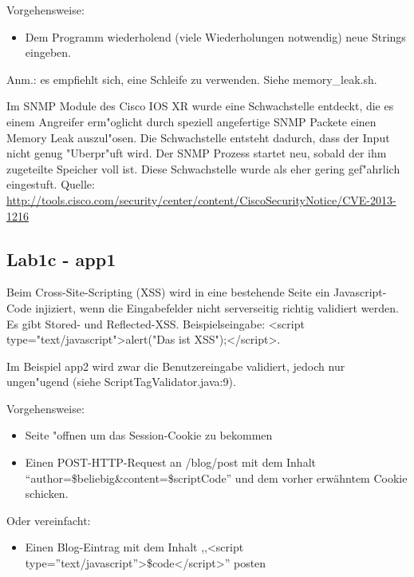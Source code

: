 \documentclass[12pt,a4paper,titlepage,oneside]{scrartcl}
\begin{document}
\begin{description}
Vorgehensweise:
\begin{itemize}
	\item Dem Programm wiederholend (viele Wiederholungen notwendig) neue Strings eingeben.
\end{itemize}
Anm.: es empfiehlt sich, eine Schleife zu verwenden. Siehe memory\_leak.sh.\newline
    
    Im SNMP Module des Cisco IOS XR wurde eine Schwachstelle entdeckt, die es einem Angreifer erm"oglicht durch speziell angefertige SNMP Packete einen Memory Leak auszul"osen. Die Schwachstelle entsteht dadurch, dass der Input nicht genug "Uberpr"uft wird. Der SNMP Prozess startet neu, sobald der ihm zugeteilte Speicher voll ist. Diese Schwachstelle wurde als eher gering gef"ahrlich eingestuft.\newline
    Quelle: \url{http://tools.cisco.com/security/center/content/CiscoSecurityNotice/CVE-2013-1216}
\end{description}

\subsection{Lab1c - app1}
Beim Cross-Site-Scripting (XSS) wird in eine bestehende Seite ein Javascript-Code injiziert, wenn die Eingabefelder nicht serverseitig richtig validiert werden.\newline
Es gibt Stored- und Reflected-XSS.\newline
Beispielseingabe: <script type="text/javascript">alert("Das ist XSS");</script>.\newline

Im Beispiel app2 wird zwar die Benutzereingabe validiert, jedoch nur ungen"ugend (siehe ScriptTagValidator.java:9).\newline

Vorgehensweise:
\begin{itemize}
	\item Seite "offnen um das Session-Cookie zu bekommen
	\item Einen POST-HTTP-Request an /blog/post mit dem Inhalt ``author=\$beliebig\&content=\$scriptCode'' und dem vorher erwähntem Cookie schicken.
\end{itemize}

Oder vereinfacht:
\begin{itemize}
	\item Einen Blog-Eintrag mit dem Inhalt ,,<script type=''text/javascript''>\$code</script>'' posten
\end{itemize}
\end{document}
